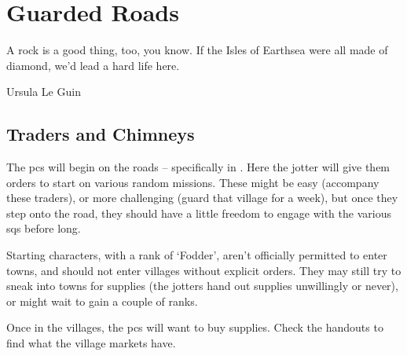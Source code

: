 \chapter{Guarded Roads}
\epigraph{A rock is a good thing, too, you know. If the Isles of Earthsea were all made of diamond, we'd lead a hard life here.}{Ursula Le Guin}

\section{Traders and Chimneys}

The \glspl{pc} will begin on the roads -- specifically in .
Here the \gls{jotter} will give them orders to start on various random missions.%
These might be easy (accompany these traders), or more challenging (guard that \gls{village} for a week), but once they step onto the road, they should have a little freedom to engage with the various \glspl{sq} before long.

Starting characters, with a rank of `Fodder',%
aren't officially permitted to enter towns, and should not enter \glspl{village} without explicit orders.
They may still try to sneak into towns for supplies (the \glspl{jotter} hand out supplies unwillingly or never), or might wait to gain a couple of ranks.

Once in the \glspl{village}, the \glspl{pc} will want to buy supplies.
Check the handouts to find what the \gls{village} markets have.
